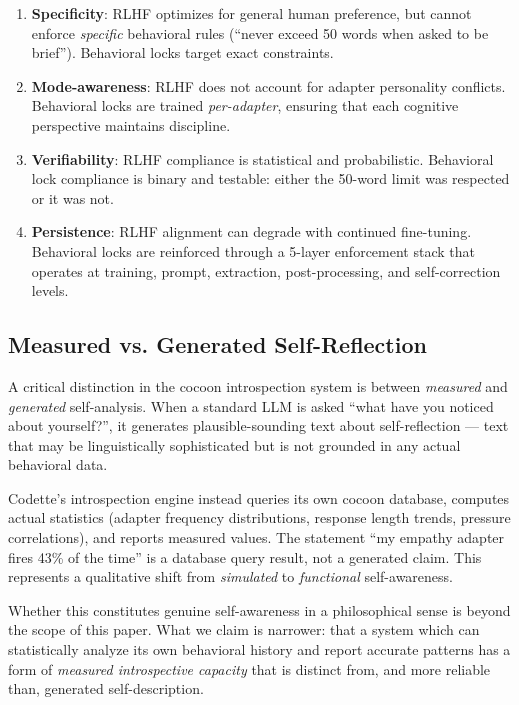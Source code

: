 \begin{enumerate}
    \item \textbf{Specificity}: RLHF optimizes for general human preference,
    but cannot enforce \emph{specific} behavioral rules (``never exceed 50
    words when asked to be brief''). Behavioral locks target exact
    constraints.

    \item \textbf{Mode-awareness}: RLHF does not account for adapter
    personality conflicts. Behavioral locks are trained \emph{per-adapter},
    ensuring that each cognitive perspective maintains discipline.

    \item \textbf{Verifiability}: RLHF compliance is statistical and
    probabilistic. Behavioral lock compliance is binary and testable:
    either the 50-word limit was respected or it was not.

    \item \textbf{Persistence}: RLHF alignment can degrade with continued
    fine-tuning. Behavioral locks are reinforced through a 5-layer
    enforcement stack that operates at training, prompt, extraction,
    post-processing, and self-correction levels.
\end{enumerate}

\subsection{Measured vs. Generated Self-Reflection}

A critical distinction in the cocoon introspection system is between
\emph{measured} and \emph{generated} self-analysis. When a standard LLM
is asked ``what have you noticed about yourself?'', it generates
plausible-sounding text about self-reflection --- text that may be
linguistically sophisticated but is not grounded in any actual behavioral
data.

Codette's introspection engine instead queries its own cocoon database,
computes actual statistics (adapter frequency distributions, response
length trends, pressure correlations), and reports measured values. The
statement ``my empathy adapter fires 43\% of the time'' is a database
query result, not a generated claim. This represents a qualitative shift
from \emph{simulated} to \emph{functional} self-awareness.

Whether this constitutes genuine self-awareness in a philosophical sense
is beyond the scope of this paper. What we claim is narrower: that a
system which can statistically analyze its own behavioral history and
report accurate patterns has a form of \emph{measured introspective
capacity} that is distinct from, and more reliable than, generated
self-description.
